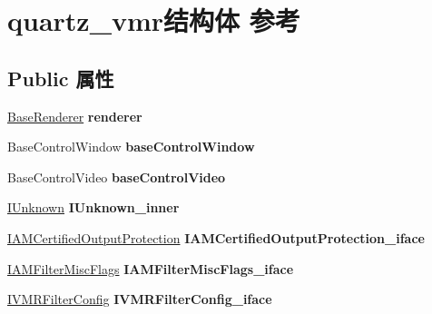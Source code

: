 \hypertarget{structquartz__vmr}{}\section{quartz\+\_\+vmr结构体 参考}
\label{structquartz__vmr}
\subsection*{Public 属性}
\begin{DoxyCompactItemize}
\item 
\mbox{\label{structquartz__vmr_acbd9316e9d9dc6e270e4d65fd5b80b38}} 
\hyperlink{struct_base_renderer_tag}{Base\+Renderer} {\bfseries renderer}
\item 
\mbox{\label{structquartz__vmr_a51f626cf79bde133640217e38ce0b871}} 
Base\+Control\+Window {\bfseries base\+Control\+Window}
\item 
\mbox{\label{structquartz__vmr_a5b5015c1cc40fbd85322508f8df5cf4c}} 
Base\+Control\+Video {\bfseries base\+Control\+Video}
\item 
\mbox{\label{structquartz__vmr_a854fbe88a2e3386d9bc6c73d4fa06df0}} 
\hyperlink{interface_i_unknown}{I\+Unknown} {\bfseries I\+Unknown\+\_\+inner}
\item 
\mbox{\label{structquartz__vmr_a40b9ac7d1710398f7bd878b6f3df3409}} 
\hyperlink{interface_i_a_m_certified_output_protection}{I\+A\+M\+Certified\+Output\+Protection} {\bfseries I\+A\+M\+Certified\+Output\+Protection\+\_\+iface}
\item 
\mbox{\label{structquartz__vmr_af12520d2eded8e168fcc7a69c3ad4956}} 
\hyperlink{interface_i_a_m_filter_misc_flags}{I\+A\+M\+Filter\+Misc\+Flags} {\bfseries I\+A\+M\+Filter\+Misc\+Flags\+\_\+iface}
\item 
\mbox{\label{structquartz__vmr_a056c829ea051eba8ed544bd51f7a3213}} 
\hyperlink{interface_i_v_m_r_filter_config}{I\+V\+M\+R\+Filter\+Config} {\bfseries I\+V\+M\+R\+Filter\+Config\+\_\+iface}
\item 
\mbox{\label{structquartz__vmr_aa5fa336ba9ba143792301127fc26517b}} 

\end{DoxyCompactItemize}
